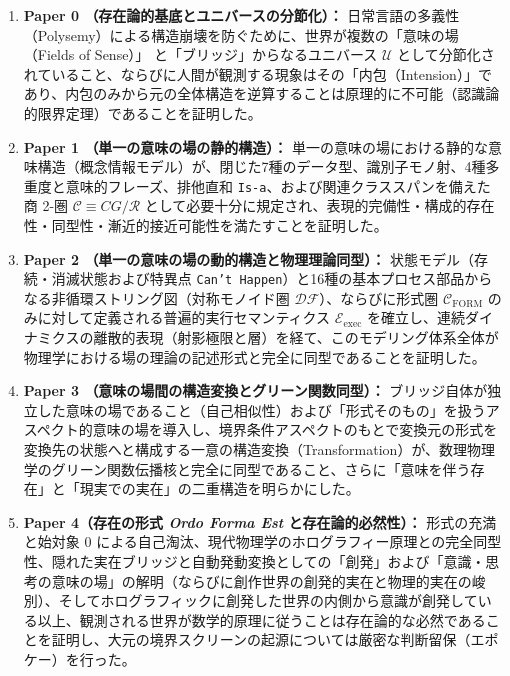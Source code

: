 \documentclass[11pt,a4paper]{ltjsarticle}
\theoremstyle{definition}
\theoremstyle{plain}
\begin{document}
\begin{enumerate}
    \item \textbf{Paper 0 \cite{Ota2026_0}（存在論的基底とユニバースの分節化）：} 日常言語の多義性（Polysemy）による構造崩壊を防ぐために、世界が複数の「意味の場（Fields of Sense）」\cite{Gabriel2015} と「ブリッジ」からなるユニバース $\mathcal{U}$ として分節化されていること、ならびに人間が観測する現象はその「内包（Intension）」であり、内包のみから元の全体構造を逆算することは原理的に不可能（認識論的限界定理）であることを証明した。
    \item \textbf{Paper 1 \cite{Ota2026_1}（単一の意味の場の静的構造）：} 単一の意味の場における静的な意味構造（概念情報モデル）が、閉じた7種のデータ型、識別子モノ射、4種多重度と意味的フレーズ、排他直和 \texttt{Is-a}、および関連クラススパンを備えた商 2-圏 $\mathcal{C} \equiv CG/\mathcal{R}$ として必要十分に規定され、表現的完備性・構成的存在性・同型性・漸近的接近可能性を満たすことを証明した。
    \item \textbf{Paper 2 \cite{Ota2026_2}（単一の意味の場の動的構造と物理理論同型）：} 状態モデル（存続・消滅状態および特異点 \texttt{Can't Happen}）と16種の基本プロセス部品からなる非循環ストリング図（対称モノイド圏 $\mathcal{DF}$）、ならびに形式圏 $\mathcal{C}_{\mathrm{FORM}}$ のみに対して定義される普遍的実行セマンティクス $\mathcal{E}_{\mathrm{exec}}$ を確立し、連続ダイナミクスの離散的表現（射影極限と層）を経て、このモデリング体系全体が物理学における場の理論の記述形式と完全に同型であることを証明した。
    \item \textbf{Paper 3 \cite{Ota2026_3}（意味の場間の構造変換とグリーン関数同型）：} ブリッジ自体が独立した意味の場であること（自己相似性）および「形式そのもの」を扱うアスペクト的意味の場を導入し、境界条件アスペクトのもとで変換元の形式を変換先の状態へと構成する一意の構造変換（Transformation）が、数理物理学のグリーン関数伝播核と完全に同型であること、さらに「意味を伴う存在」と「現実での実在」の二重構造を明らかにした。
    \item \textbf{Paper 4（存在の形式 \textit{Ordo Forma Est} と存在論的必然性）：} 形式の充満と始対象 $0$ による自己淘汰、現代物理学のホログラフィー原理との完全同型性、隠れた実在ブリッジと自動発動変換としての「創発」および「意識・思考の意味の場」の解明（ならびに創作世界の創発的実在と物理的実在の峻別）、そしてホログラフィックに創発した世界の内側から意識が創発している以上、観測される世界が数学的原理に従うことは存在論的な必然であることを証明し、大元の境界スクリーンの起源については厳密な判断留保（エポケー）を行った。
\end{enumerate}
\end{document}
